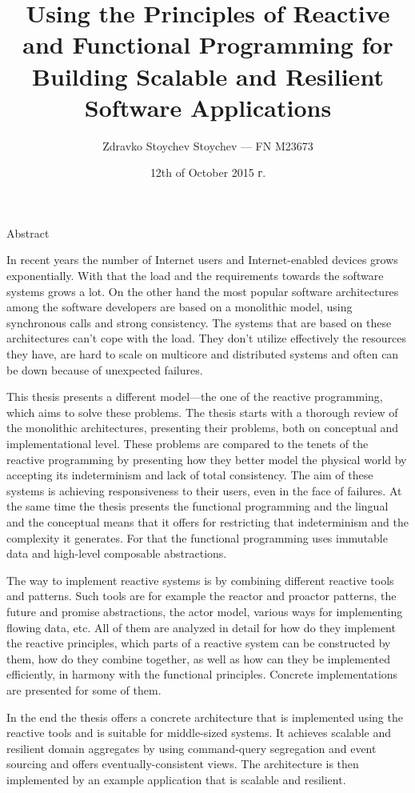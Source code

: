 \documentclass[a4paper, 12pt]{article}
\title{Using the Principles of Reactive and Functional Programming for Building Scalable and Resilient Software Applications}
\author{Zdravko Stoychev Stoychev — FN M23673}
\date{12th of October 2015 г.}
\begin{document}
  \maketitle
  
  \begin{center}
    \large Abstract
    \vspace{0.2em}
  \end{center}

  In recent years the number of Internet users and Internet-enabled devices grows exponentially. With that the load and the requirements towards the software systems grows a lot. On the other hand the most popular software architectures among the software developers are based on a monolithic model, using synchronous calls and strong consistency. The systems that are based on these architectures can’t cope with the load. They don’t utilize effectively the resources they have, are hard to scale on multicore and distributed systems and often can be down because of unexpected failures.
  
  This thesis presents a different model—the one of the reactive programming, which aims to solve these problems. The thesis starts with a thorough review of the monolithic architectures, presenting their problems, both on conceptual and implementational level. These problems are compared to the tenets of the reactive programming by presenting how they better model the physical world by accepting its indeterminism and lack of total consistency. The aim of these systems is achieving responsiveness to their users, even in the face of failures. At the same time the thesis presents the functional programming and the lingual and the conceptual means that it offers for restricting that indeterminism and the complexity it generates. For that the functional programming uses immutable data and high-level composable abstractions.
  
  The way to implement reactive systems is by combining different reactive tools and patterns. Such tools are for example the reactor and proactor patterns, the future and promise abstractions, the actor model, various ways for implementing flowing data, etc. All of them are analyzed in detail for how do they implement the reactive principles, which parts of a reactive system can be constructed by them, how do they combine together, as well as how can they be implemented efficiently, in harmony with the functional principles. Concrete implementations are presented for some of them.
  
  In the end the thesis offers a concrete architecture that is implemented using the reactive tools and is suitable for middle-sized systems. It achieves scalable and resilient domain aggregates by using command-query segregation and event sourcing and offers eventually-consistent views. The architecture is then implemented by an example application that is scalable and resilient.
\end{document}
